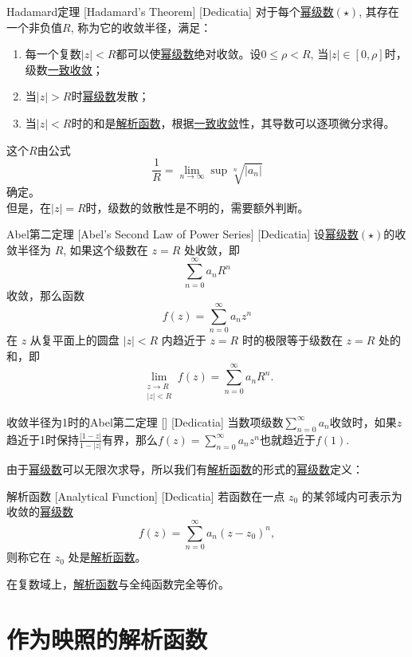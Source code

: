 \documentclass[UTF8]{ctexart}
\newcommand{\AnalyticalFunction}{\hyperref[dfn:AnalyticalFunction]{解析函数}}
\newcommand{\PowerSeries}{\hyperref[dfn:PowerSeries]{幂级数}}
\newcommand{\UniformConvergence}{\hyperref[dfn:UniformConvergence]{一致收敛}}
\begin{document}
\begin{thm}
    [UUID]
    {Hadamard定理}
    [Hadamard's Theorem]
    [Dedicatia]
    对于每个\PowerSeries $(\star)$, 其存在一个非负值$R$, 称为它的收敛半径，满足：
    \begin{enumerate}
        \item 每一个复数$|z|<R$都可以使\PowerSeries 绝对收敛。设$0\leqslant\rho <R$, 当$|z|\in[0,\rho]$时，级数\UniformConvergence ；
        \item 当$|z|>R$时\PowerSeries 发散；
        \item 当$|z|<R$时的和是\AnalyticalFunction ，根据\UniformConvergence 性，其导数可以逐项微分求得。
    \end{enumerate}
    这个$R$由公式
    \[\frac{1}{R}=\lim_{n\to \infty}\sup\sqrt[n]{|a_n|}\]
    确定。\\
    但是，在$|z|=R$时，级数的敛散性是不明的，需要额外判断。
\end{thm}
\begin{thm}
    [UUID]
    {Abel第二定理}
    [Abel's Second Law of Power Series]
    [Dedicatia]
    设\PowerSeries $(\star)$的收敛半径为 \( R \), 如果这个级数在 \( z = R \) 处收敛，即
    \[\sum_{n=0}^{\infty} a_n R^n\]
    收敛，那么函数
    \[f(z) = \sum_{n=0}^{\infty} a_n z^n\]
    在 \( z \) 从复平面上的圆盘 \( |z| < R \) 内趋近于 \( z = R \) 时的极限等于级数在 \( z = R \) 处的和，即
    \[\lim_{\substack{z \to R \\ |z| < R}} f(z) = \sum_{n=0}^{\infty} a_n R^n.\]
\end{thm}
\begin{xmp}
    [UUID]
    {收敛半径为1时的Abel第二定理}
    []
    [Dedicatia]
    当数项级数$\sum\limits_{n=0}^\infty a_n$收敛时，如果$z$趋近于1时保持$\frac{|1-z|}{1-|z|}$有界，那么$f(z)=\sum\limits_{n=0}^\infty a_nz^n$也就趋近于$f(1)$.
\end{xmp}
由于\PowerSeries 可以无限次求导，所以我们有\AnalyticalFunction 的形式的\PowerSeries 定义：
\begin{dfn}
    [UUID]
    {解析函数}
    [Analytical Function]
    [Dedicatia]
    若函数在一点 \(z_0\) 的某邻域内可表示为收敛的\PowerSeries   
    \[f(z)=\sum_{n=0}^{\infty}a_n(z-z_0)^n,\]  
    则称它在 \(z_0\) 处是\AnalyticalFunction 。  
\end{dfn}
在复数域上，\AnalyticalFunction 与全纯函数完全等价。
\section{作为映照的解析函数}
\end{document}
